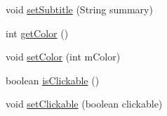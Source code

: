 \begin{DoxyCompactItemize}
\item 
void \hyperlink{classcom_1_1zia_1_1freshdocs_1_1model_1_1_basic_item_aa999f7748e6b19c0d2583eaeddf2b078}{set\-Subtitle} (String summary)
\item 
int \hyperlink{classcom_1_1zia_1_1freshdocs_1_1model_1_1_basic_item_afec2d09bdf0ef52c32d4be6437f4cb99}{get\-Color} ()
\item 
void \hyperlink{classcom_1_1zia_1_1freshdocs_1_1model_1_1_basic_item_a44b3e7c15e2d9c44ab783df3fd8fd592}{set\-Color} (int m\-Color)
\item 
boolean \hyperlink{classcom_1_1zia_1_1freshdocs_1_1model_1_1_basic_item_a623e9c1799c85a9bdc10690148a5d282}{is\-Clickable} ()
\item 
void \hyperlink{classcom_1_1zia_1_1freshdocs_1_1model_1_1_basic_item_addd545815f69fe6d0f8339f9ed31fcf3}{set\-Clickable} (boolean clickable)
\end{DoxyCompactItemize}


